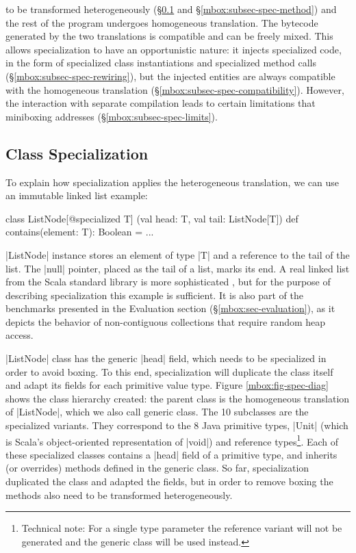  to be transformed heterogeneously (\S\ref{mbox:subsec-spec-class} and \S\ref{mbox:subsec-spec-method}) and the rest of the program undergoes homogeneous translation. The bytecode generated by the two translations is compatible and can be freely mixed. This allows specialization to have an opportunistic nature: it injects specialized code, in the form of specialized class instantiations and specialized method calls (\S\ref{mbox:subsec-spec-rewiring}), but the injected entities are always compatible with the homogeneous translation (\S\ref{mbox:subsec-spec-compatibility}). However, the interaction with separate compilation leads to certain limitations that miniboxing addresses (\S\ref{mbox:subsec-spec-limits}).

\subsection{Class Specialization}
\label{mbox:subsec-spec-class}

To explain how specialization applies the heterogeneous translation, we can use an immutable linked list example:

\begin{lstlisting-nobreak}
 class ListNode[@specialized T]
          (val head: T, val tail: ListNode[T]) {
   def contains(element: T): Boolean = ...
 }
\end{lstlisting-nobreak}

 |ListNode| instance stores an element of type |T| and a reference to the tail of the list. The |null| pointer, placed as the tail of a list, marks its end. A real linked list from the Scala standard library is more sophisticated \cite{collections-alex, adriaan}, but for the purpose of describing specialization this example is sufficient. It is also part of the benchmarks presented in the Evaluation section (\S\ref{mbox:sec-evaluation}), as it depicts the behavior of non-contiguous collections that require random heap access.

 |ListNode| class has the generic |head| field, which needs to be specialized in order to avoid boxing. To this end, specialization will duplicate the class itself and adapt its fields for each primitive value type. Figure \ref{mbox:fig-spec-diag} shows the class hierarchy created: the parent class is the homogeneous translation of |ListNode|, which we also call generic class. The 10 subclasses are the specialized variants. They correspond to the 8 Java primitive types, |Unit| (which is Scala's object-oriented representation of |void|) and reference types\footnote{Technical note: For a single type parameter the reference variant will not be generated and the generic class will be used instead.}. Each of these specialized classes contains a |head| field of a primitive type, and inherits (or overrides) methods defined in the generic class. So far, specialization duplicated the class and adapted the fields, but in order to remove boxing the methods also need to be transformed heterogeneously.

